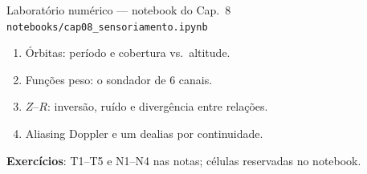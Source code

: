 \documentclass[aspectratio=169,11pt]{beamer}
\begin{document}
\begin{frame}{Laboratório numérico --- notebook do Cap.~8}
  \texttt{notebooks/cap08\_sensoriamento.ipynb}
  \begin{enumerate}
    \item Órbitas: período e cobertura vs.\ altitude.
    \item Funções peso: o sondador de 6 canais.
    \item $Z$--$R$: inversão, ruído e divergência entre relações.
    \item Aliasing Doppler e um dealias por continuidade.
  \end{enumerate}
  \vspace{0.4em}
  \textbf{Exercícios}: T1--T5 e N1--N4 nas notas; células reservadas no
  notebook.
  \vfill
  \atribuicao
\end{frame}
\end{document}
